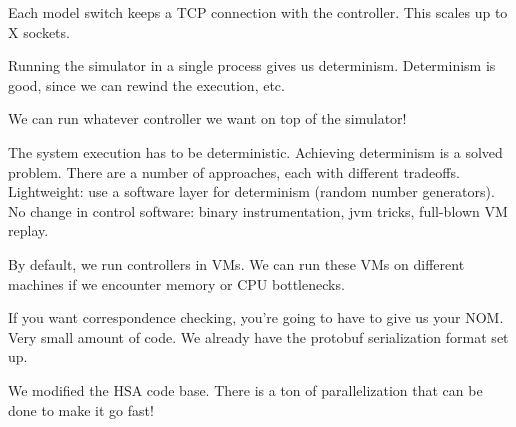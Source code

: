 Each model switch keeps a TCP connection with the controller. This scales up
to X sockets.

Running the simulator in a single process gives us determinism. Determinism is
good, since we can rewind the execution, etc.


We can run whatever controller we want on top of the simulator!

The system execution has to be deterministic. Achieving determinism 
is a solved problem. There are a number of approaches, each with different
tradeoffs. Lightweight: use a software layer for determinism (random number
generators). No change in control software: binary instrumentation, jvm
tricks, full-blown VM replay.

By default, we run controllers in VMs. We can run these VMs on different
machines if we encounter memory or CPU bottlenecks.

If you want correspondence checking, you're going to have to give us your NOM.
Very small amount of code. We already have the protobuf serialization format
set up.


We modified the HSA code base. There is a ton of parallelization that can be
done to make it go fast!
